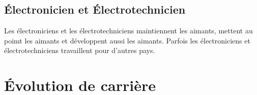 		\subsection{Électronicien et Électrotechnicien}
			Les électroniciens et les électrotechniciens maintiennent les aimants, mettent au poimt les aimants et développent aussi les aimants. Parfois les électroniciens et électrotechniciens travaillent pour d'autres pays.

	\section{Évolution de carrière}
		\blindtext
		
